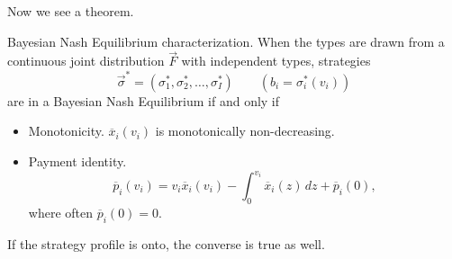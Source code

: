 Now we see a theorem.
\begin{theorem}
	Bayesian Nash Equilibrium characterization. When the types are drawn from a continuous joint distribution \(\vec{F}\) with independent types,
	strategies
	\[
		\vec{\sigma}^{*} = (\sigma^{*}_1, \sigma^{*}_2, \ldots , \sigma^{*}_I)\qquad (b_{i} = \sigma^{*}_{i}(v_{i}))
	\]
	are in a Bayesian Nash Equilibrium if and only if
	\begin{itemize}
		\item Monotonicity. \(\overline{x}_{i}(v_{i})\) is monotonically non-decreasing.
		\item Payment identity.
		      \[
			      \overline{p}_{i}(v_{i}) = v_{i}\overline{x}_{i}(v_{i}) - \int_0^{v_{i}} \overline{x}_{i}(z)\,dz + \overline{p}_{i}(0),
		      \]
		      where often \(\overline{p}_{i}(0) = 0\).
	\end{itemize}
	If the strategy profile is onto, the converse is true as well.
\end{theorem}